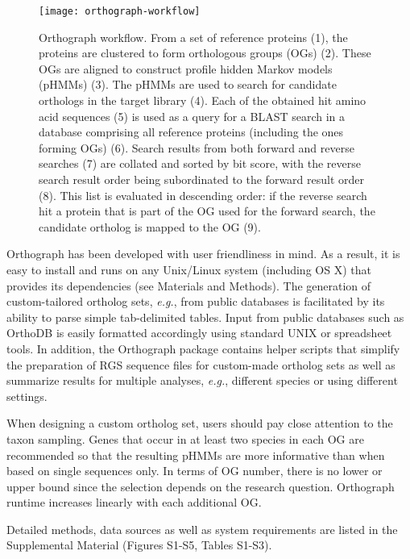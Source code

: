 \begin{figure}[t]
\begin{center}
\texttt{[image: orthograph-workflow]}
\caption[Orthograph workflow]{Orthograph workflow. From a set of
	reference proteins (1), the proteins are clustered to form orthologous groups
	(OGs) (2). These OGs are aligned to construct profile hidden Markov models
	(pHMMs) (3). The pHMMs are used to search for candidate orthologs in the
	target library (4). Each of the obtained hit amino acid sequences (5) is used
	as a query for a BLAST search in a database comprising all reference proteins
	(including the ones forming OGs) (6). Search results from both forward and
	reverse searches (7) are collated and sorted by bit score, with the reverse
	search result order being subordinated to the forward result order (8). This
	list is evaluated in descending order: if the reverse search hit a protein
	that is part of the OG used for the forward search, the candidate ortholog is
	mapped to the OG (9).}
	\label{fig:orthograph-workflow}
\end{center}
\end{figure}

Orthograph has been developed with user friendliness in mind. As a
result, it is easy to install and runs on any Unix/Linux system
(including OS X) that provides its dependencies (see Materials and
Methods). The generation of custom-tailored ortholog sets, \emph{e.g.},
from public databases is facilitated by its ability to parse simple
tab-delimited tables. Input from public databases such as OrthoDB is
easily formatted accordingly using standard UNIX or spreadsheet tools.
In addition, the Orthograph package contains helper scripts that
simplify the preparation of RGS sequence files for custom-made ortholog
sets as well as summarize results for multiple analyses, \emph{e.g.},
different species or using different settings.

When designing a custom ortholog set, users should pay close attention
to the taxon sampling. Genes that occur in at least two species in each
OG are recommended so that the resulting pHMMs are more informative than
when based on single sequences only. In terms of OG number, there is no
lower or upper bound since the selection depends on the research
question. Orthograph runtime increases linearly with each additional OG.

Detailed methods, data sources as well as system requirements are listed
in the Supplemental Material (Figures S1-S5, Tables S1-S3).

